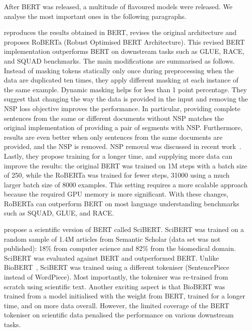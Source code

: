 After BERT was released, a multitude of flavoured models were released. We analyse the most important ones in the following paragraphs. 

\cite{liu2019roberta} reproduces the results obtained in BERT, revises the original architecture and proposes RoBERTa (Robust Optimised BERT Architecture). This revised BERT implementation outperforms BERT on downstream tasks such as GLUE, RACE, and SQUAD benchmarks. 
The main modifications are summarised as follows. Instead of masking tokens statically only once during preprocessing when the data are duplicated ten times, they apply different masking at each instance of the same example. Dynamic masking helps for less than 1 point percentage.
They suggest that changing the way the data is provided in the input and removing the NSP loss objective improves the performance. 
In particular, providing complete sentences from the same or different documents without NSP matches the original implementation of providing a pair of segments with NSP. 
Furthermore, results are even better when only sentences from the same documents are provided, and the NSP is removed.
NSP removal was discussed in recent work~\cite{lample2019cross}.
Lastly, they propose training for a longer time, and supplying more data can improve the results: the original BERT was trained on 1M steps with a batch size of 250, while the RoBERTa was trained for fewer steps, 31000 using a much larger batch size of 8000 examples. This setting requires a more scalable approach because the required GPU memory is more significant. 
With these changes, RoBERTa can outperform BERT on most language understanding benchmarks such as SQUAD, GLUE, and RACE. 

\cite{Beltagy2019SciBERT} propose a scientific version of BERT called SciBERT. 
SciBERT was trained on a random sample of 1.4M articles from Semantic Scholar (data set was not published): 18\% from computer science and 82\% from the biomedical domain. SciBERT was evaluated against BERT and outperformed BERT. 
Unlike BioBERT~\cite{lee2019biobert}, SciBERT was trained using a different tokeniser (SentencePiece instead of WordPiece). Most importantly, the tokeniser was re-trained from scratch using scientific text.
Another exciting aspect is that BioBERT was trained from a model initialised with the weight from BERT, trained for a longer time, and on more data overall. However, the limited coverage of the BERT tokeniser on scientific data penalised the performance on various downstream tasks.

